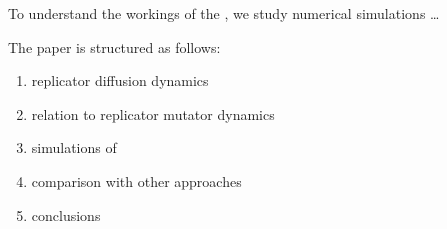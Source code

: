 To understand the workings of the \rdd, we study numerical simulations
\dots

The paper is structured as follows:
\begin{enumerate}
\item replicator diffusion dynamics
\item relation to replicator mutator dynamics
\item simulations of \rdd
\item comparison with other approaches
\item conclusions
\end{enumerate}





